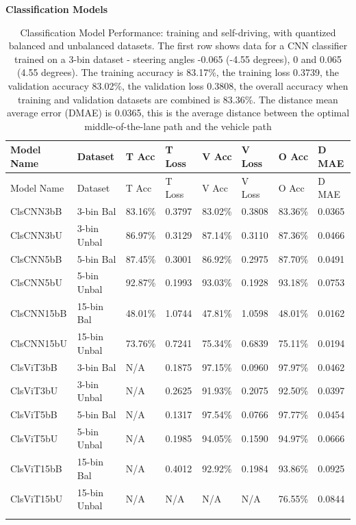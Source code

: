 \textbf{Classification Models}
\begin{longtable}{@{}llllllll@{}}
\toprule
Model Name & Dataset & T Acc & T Loss & V Acc & V Loss & O Acc & D MAE \\
\midrule
\endfirsthead
\toprule
Model Name & Dataset & T Acc & T Loss & V Acc & V Loss & O Acc & D MAE \\
\midrule
\endhead
ClsCNN3bB & 3-bin Bal & 83.16\% & 0.3797 & 83.02\% & 0.3808 & 83.36\% & 0.0365 \\
ClsCNN3bU & 3-bin Unbal & 86.97\% & 0.3129 & 87.14\% & 0.3110 & 87.36\% & 0.0466 \\
ClsCNN5bB & 5-bin Bal & 87.45\% & 0.3001 & 86.92\% & 0.2975 & 87.70\% & 0.0491 \\
ClsCNN5bU & 5-bin Unbal & 92.87\% & 0.1993 & 93.03\% & 0.1928 & 93.18\% & 0.0753 \\
ClsCNN15bB & 15-bin Bal & 48.01\% & 1.0744 & 47.81\% & 1.0598 & 48.01\% & 0.0162 \\
ClsCNN15bU & 15-bin Unbal & 73.76\% & 0.7241 & 75.34\% & 0.6839 & 75.11\% & 0.0194 \\
ClsViT3bB & 3-bin Bal & N/A & 0.1875 & 97.15\% & 0.0960 & 97.97\% & 0.0462 \\
ClsViT3bU & 3-bin Unbal & N/A & 0.2625 & 91.93\% & 0.2075 & 92.50\% & 0.0397 \\
ClsViT5bB & 5-bin Bal & N/A & 0.1317 & 97.54\% & 0.0766 & 97.77\% & 0.0454 \\
ClsViT5bU & 5-bin Unbal & N/A & 0.1985 & 94.05\% & 0.1590 & 94.97\% & 0.0666 \\
ClsViT15bB & 15-bin Bal & N/A & 0.4012 & 92.92\% & 0.1984 & 93.86\% & 0.0925 \\
ClsViT15bU & 15-bin Unbal & N/A & N/A & N/A & N/A & 76.55\% & 0.0844 \\
\bottomrule
\caption{Classification Model Performance: training and self-driving, with quantized balanced and unbalanced datasets. The first row shows data for a CNN classifier trained on a 3-bin dataset - steering angles -0.065 (-4.55 degrees), 0 and 0.065 (4.55 degrees). The training accuracy is 83.17\%, the training loss 0.3739, the validation accuracy 83.02\%, the validation loss 0.3808, the overall accuracy when training and validation datasets are combined is 83.36\%. The distance mean average error (DMAE) is 0.0365, this is the average distance between the optimal middle-of-the-lane path and the vehicle path}
\label{results:classifier_models_results_table}
\end{longtable}

